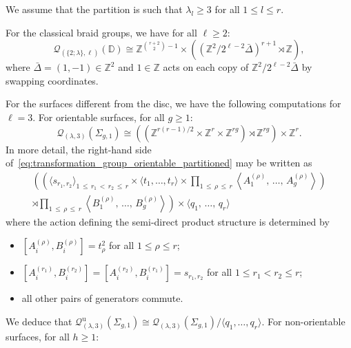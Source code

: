 \documentclass[AHL,Unicode,published]{cedram}
\newcommand{\unt}{\mathrm{u}}
\newcommand{\cQ}{\mathcal{Q}}
\newcommand{\bD}{\mathbb{D}}
\newcommand{\bZ}{\mathbb{Z}}
\renewcommand{\geq}{\geqslant}
\renewcommand{\leq}{\leqslant}
\begin{document}
\begin{prop}\label{prop:transformation_groups_2_nilpotent_quotient_surface_braid_groups}
We assume that the partition is such that $\lambda_{l}\geq 3$ for all $1\leq l\leq r$.

For the classical braid groups, we have for all $\ell\geq 2$:
\[
\cQ_{(\boldsymbol{\{}2;\lambda\boldsymbol{\}},\ell)}(\bD) \cong \bZ^{\binom{r+2}{2} - 1} \times \left((\bZ^2/2^{\ell-2}\bar{\Delta})^{r+1} \rtimes \bZ\right),
\]
where $\bar{\Delta} = (1,-1) \in \bZ^2$ and $1 \in \bZ$ acts on each copy of $\bZ^2/2^{\ell-2}\bar{\Delta}$ by swapping coordinates.

For the surfaces different from the disc, we have the following computations for $\ell = 3$. For orientable surfaces, for all $g\geq 1$:
\begin{equation}\label{eq:transformation_group_orientable_partitioned}
\cQ_{(\lambda,3)}(\Sigma_{g,1})\cong \left((\bZ^{r(r-1)/2}\times\bZ^{r}\times\bZ^{rg})\rtimes\bZ^{rg}\right)\times \bZ^{r}.
\end{equation}
In more detail, the right-hand side of~\eqref{eq:transformation_group_orientable_partitioned} may be written as
\begin{multline*}
\left(\left(\langle s_{r_{1},r_{2}}\rangle_{1\,\leq\,r_{1}\,<\,r_{2}\,\leq\,r} \times \langle t_{1},\ldots,t_{r}\rangle \times\prod_{1\,\leq\,\rho\,\leq\,r}\left\langle A_{1}^{(\rho)},\,\ldots,\,A_{g}^{(\rho)}\right\rangle \right)\right. \\
\left. \rtimes \prod_{1\,\leq\,\rho\,\leq\,r}\left\langle B_{1}^{(\rho)},\,\ldots,\,B_{g}^{(\rho)}\right\rangle \right) \times \langle q_{1},\,\ldots,\,q_{r}\rangle
\end{multline*}
where the action defining the semi-direct product structure is determined by
\begin{itemize}
\item $[A^{(\rho)}_{i},B^{(\rho)}_{i}] = t_{\rho}^{2}$ for all $1\leq \rho\leq r$;
\item $[A_{i}^{(r_{1})},B_{i}^{(r_{2})}]= [A_{i}^{(r_{2})},B_{i}^{(r_{1})}]= s_{r_{1},r_{2}}$ for all $1\leq r_{1}< r_{2}\leq r$;
\item all other pairs of generators commute.
\end{itemize}
We deduce that $\cQ_{(\lambda,3)}^{\unt}(\Sigma_{g,1}) \cong \cQ_{(\lambda,3)}(\Sigma_{g,1})/\langle q_{1},\ldots,q_{r}\rangle$. For non-orientable surfaces, for all $h\geq 1$:
\begin{multline}\label{eq:transformation_group_non-orientable_partitioned}

\end{multline}
\end{prop}
\end{document}
